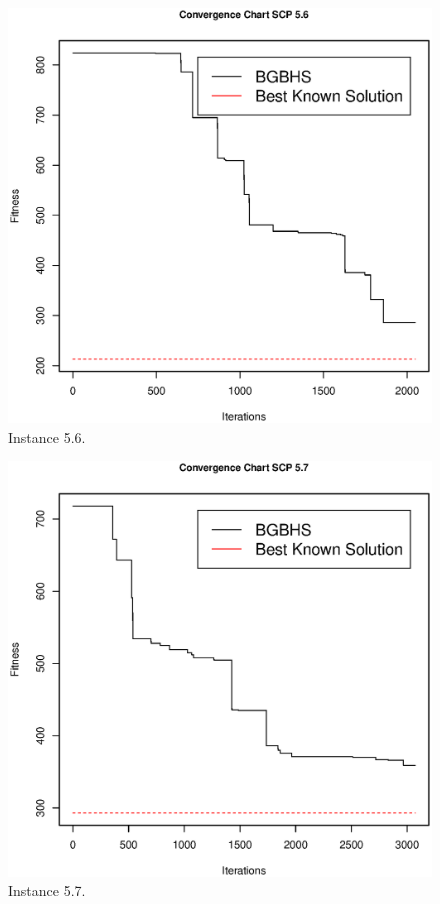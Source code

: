 \begin{figure}[]
\centering
\includegraphics[scale=.45]{Resultados/scp56.eps}
\caption{Instance 5.6.}
\label{fig:Instance.5.6}
\end{figure}
\begin{figure}[]
\centering
\includegraphics[scale=.45]{Resultados/scp57.eps}
\caption{Instance 5.7.}
\label{fig:Instance.5.7}
\end{figure}
